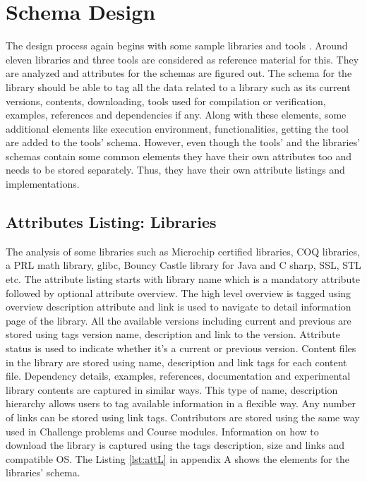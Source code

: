 \documentclass[11pt,letterpaper]{report}
\begin{document}
\section*{Schema Design}
The design process again begins with some sample libraries and tools \cite{Alea, DFC, MCHIP, BCastleJava, BSharp,Glibc,COQ,CADP,STL,NUSMV,SMPS}. Around eleven libraries and three tools are considered as reference material for this.  They are analyzed and attributes for the schemas are figured out. The schema for the library should be able to tag all the data related to a library such as its current versions, contents, downloading, tools used for compilation or verification, examples, references and dependencies if any. Along with these elements, some additional elements like execution environment, functionalities, getting the tool are added to the tools' schema. However, even though the tools' and the libraries' schemas contain some common elements they have their own attributes too and needs to be stored separately. Thus, they have their own attribute listings and implementations.
\subsection*{Attributes Listing: Libraries}
The analysis of some libraries such as Microchip certified libraries, COQ libraries, a PRL math library, glibc, Bouncy Castle library for Java and C sharp, SSL, STL etc. The attribute listing starts with library name which is a mandatory attribute followed by optional attribute overview. The high level overview is tagged using overview description attribute and link is used to navigate to detail information page of the library. All the available versions including current and previous are stored using tags version name, description and link to the version. Attribute status is used to indicate whether it's a current or previous version. Content files in the library are stored using name, description and link tags for each content file. Dependency details, examples, references, documentation and experimental library contents are captured in similar ways. This type of name, description hierarchy allows users to tag available information in a flexible way. Any number of links can be stored using link tags. Contributors are stored using the same way used in Challenge problems and Course modules. Information on how to download the library is captured using the tags description, size and links and compatible OS. The Listing \ref{lst:attL} in appendix A shows the elements for the libraries' schema.
\end{document}
